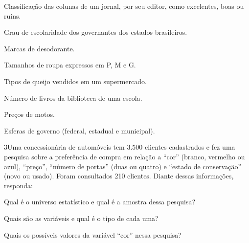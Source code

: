 \begin{escolha}
\item
  Classificação das colunas de um jornal, por seu editor, como
  excelentes, boas ou ruins.


\item
  Grau de escolaridade dos governantes dos estados brasileiros.


\item
  Marcas de desodorante.


\item
  Tamanhos de roupa expressos em P, M e G.


\item
  Tipos de queijo vendidos em um supermercado.


\item
  Número de livros da biblioteca de uma escola.


\item
  Preços de motos.


\item
  Esferas de governo (federal, estadual e municipal).

\end{escolha}

\num{3}Uma concessionária de automóveis tem 3.500 clientes cadastrados e
fez uma pesquisa sobre a preferência de compra em relação a “cor”
(branco, vermelho ou azul), “preço”, “número de portas” (duas ou
quatro) e “estado de conservação” (novo ou usado). Foram consultados
210 clientes. Diante dessas informações, responda:

\begin{escolha}
\item
  Qual é o universo estatístico e qual é a amostra dessa pesquisa?


\item
  Quais são as variáveis e qual é o tipo de cada uma?


\item
  Quais os possíveis valores da variável “cor” nessa pesquisa?

\end{escolha}

